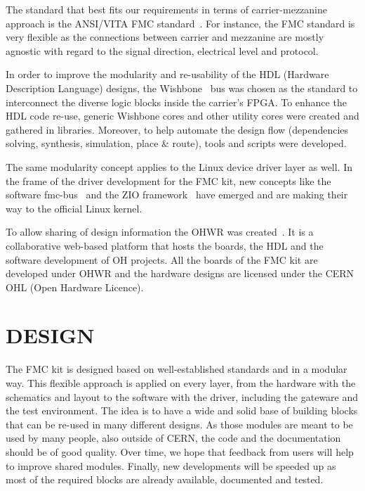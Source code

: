 \documentclass{JAC2003}
\begin{document}
The standard that best fits our requirements in terms of carrier-mezzanine approach is the ANSI/VITA FMC standard~\cite{fmc}.
For instance, the FMC standard is very flexible as the connections between carrier and mezzanine are mostly agnostic with regard to the signal direction, electrical level and protocol.

In order to improve the modularity and re-usability of the HDL (Hardware Description Language) designs, the Wishbone~\cite{wishbone} bus was chosen as the standard to interconnect the diverse logic blocks inside the carrier's FPGA.
To enhance the HDL code re-use, generic Wishbone cores and other utility cores were created and gathered in libraries.
Moreover, to help automate the design flow (dependencies solving, synthesis, simulation, place \& route), tools and scripts were developed.

The same modularity concept applies to the Linux device driver layer as well.
In the frame of the driver development for the FMC kit, new concepts like the software fmc-bus~\cite{fmc-bus} and the ZIO framework~\cite{zio} have emerged and are making their way to the official Linux kernel.

To allow sharing of design information the OHWR was created~\cite{icalepcs}.
It is a collaborative web-based platform that hosts the boards, the HDL and the software development of OH projects.
All the boards of the FMC kit are developed under OHWR and the hardware designs are licensed under the CERN OHL (Open Hardware Licence).

\section{DESIGN}

The FMC kit is designed based on well-established standards and in a modular way.
This flexible approach is applied on every layer, from the hardware with the schematics and layout to the software with the driver, including the gateware and the test environment.
The idea is to have a wide and solid base of building blocks that can be re-used in many different designs.
As those modules are meant to be used by many people, also outside of CERN, the code and the documentation should be of good quality.
Over time, we hope that feedback from users will help to improve shared modules.
Finally, new developments will be speeded up as most of the required blocks are already available, documented and tested.
\end{document}
